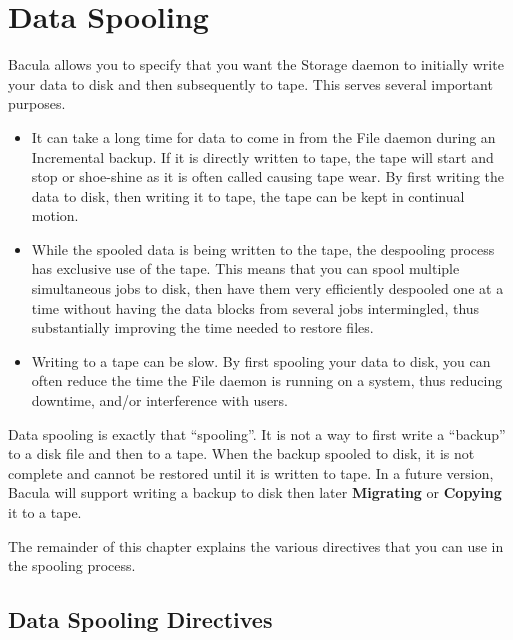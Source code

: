 
\section*{Data Spooling}
\label{_ChapterStart5}

Bacula allows you to specify that you want the Storage daemon to initially
write your data to disk and then subsequently to tape. This serves several
important purposes. 

\begin{itemize}
\item It can take a long time for data to come in from the File  daemon during
   an Incremental backup. If it is directly  written to tape, the tape will start
   and stop or shoe-shine  as it is often called causing tape wear. By first
writing  the data to disk, then writing it to tape, the tape can be  kept in
continual motion. 
\item While the spooled data is being written to the tape, the  despooling
   process has exclusive use of the tape. This  means that you can spool multiple
   simultaneous jobs to disk,  then have them very efficiently despooled one at a
time  without having the data blocks from several jobs  intermingled, thus
substantially improving the time needed  to restore files.  
\item Writing to a tape can be slow. By first spooling your  data to disk, you
   can often reduce the time the File  daemon is running on a system, thus
   reducing downtime,  and/or interference with users. 
\end{itemize}

Data spooling is exactly that ``spooling''. It is not a way to first write a
``backup'' to a disk file and then to a tape. When the backup spooled to disk,
it is not complete and cannot be restored until it is written to tape. In a
future version, Bacula will support writing a backup to disk then later {\bf
Migrating} or {\bf Copying} it to a tape. 

The remainder of this chapter explains the various directives that you can use
in the spooling process. 
\label{directives}

\subsection*{Data Spooling Directives}

